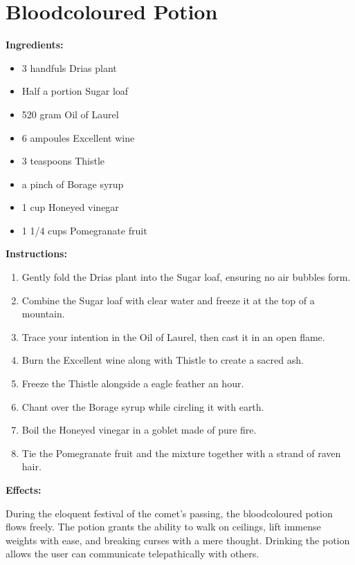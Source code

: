 \documentclass{article}
\begin{document}
\newpage
\section*{Bloodcoloured Potion}

\textbf{Ingredients:}

\begin{itemize}
  \item 3 handfuls Drias plant
  \item Half a portion Sugar loaf
  \item 520 gram Oil of Laurel
  \item 6 ampoules Excellent wine
  \item 3 teaspoons Thistle
  \item a pinch of Borage syrup
  \item 1 cup Honeyed vinegar
  \item 1 1/4 cups Pomegranate fruit
\end{itemize}

\textbf{Instructions:}

\begin{enumerate}
  \item Gently fold the Drias plant into the Sugar loaf, ensuring no air bubbles form.
  \item Combine the Sugar loaf with clear water and freeze it at the top of a mountain.
  \item Trace your intention in the Oil of Laurel, then cast it in an open flame.
  \item Burn the Excellent wine along with Thistle to create a sacred ash.
  \item Freeze the Thistle alongside a eagle feather an hour.
  \item Chant over the Borage syrup while circling it with earth.
  \item Boil the Honeyed vinegar in a goblet made of pure fire.
  \item Tie the Pomegranate fruit and the mixture together with a strand of raven hair.
\end{enumerate}

\textbf{Effects:}

During the eloquent festival of the comet’s passing, the bloodcoloured potion flows freely. The potion grants the ability to walk on ceilings, lift immense weights with ease, and breaking curses with a mere thought. Drinking the potion allows the user can communicate telepathically with others.
\end{document}
